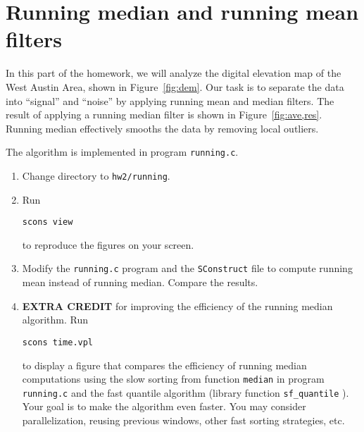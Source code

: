 \lstset{language=c,numbers=left,numberstyle=\tiny,showstringspaces=false}


\lstset{language=python,numbers=left,numberstyle=\tiny,showstringspaces=false}


\section{Running median and running mean filters}


In this part of the homework, we will analyze the digital elevation map of the West Austin Area, shown in Figure~\ref{fig:dem}. Our task is to separate the data into ``signal'' and
``noise'' by applying running mean and median filters.  The result of
applying a running median filter is shown in
Figure~\ref{fig:ave,res}. Running median effectively smooths the data
by removing local outliers.


The algorithm is implemented in program \texttt{running.c}.

\lstset{language=c,numbers=left,numberstyle=\tiny,showstringspaces=false}


\begin{enumerate}
\item Change directory to \texttt{hw2/running}.
\item Run 
\begin{verbatim}
scons view
\end{verbatim}
to reproduce the figures on your screen.
\item Modify the \texttt{running.c} program and the
  \texttt{SConstruct} file to compute running mean instead of running
  median. Compare the results.
\item \textbf{EXTRA CREDIT} for improving the efficiency of the
  running median algorithm. Run
\begin{verbatim}
scons time.vpl
\end{verbatim}
  to display a figure that compares the efficiency of running median
  computations using the slow sorting from function \texttt{median} in
  program \texttt{running.c} and the fast quantile algorithm (library
  function \texttt{sf\_quantile} ). Your goal is to make the algorithm
  even faster. You may consider parallelization, reusing previous windows,
  other fast sorting strategies, etc.
\end{enumerate}

